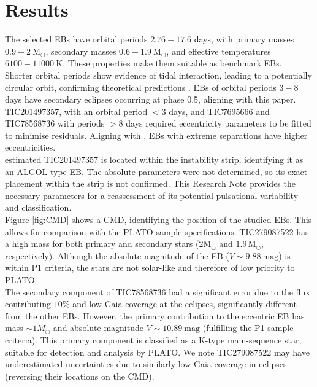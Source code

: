 \section{Results}\label{sec:Results}
The selected EBs have orbital periods $2.76- 17.6$ days, with primary masses $0.9 - 2 \mathrm{\ M_{\odot}}$, secondary masses $0.6 - 1.9\ \mathrm{M_{\odot}}$, and effective temperatures $6100- 11000\ \mathrm{K}$. These properties make them suitable as benchmark EBs.\\ 

Shorter orbital periods show evidence of tidal interaction, leading to a potentially circular orbit, confirming theoretical predictions \citep{Justesen21}. EBs of orbital periods $3-8$ days have secondary eclipses occurring at phase 0.5, aligning with this paper. TIC201497357, with an orbital period $< 3$ days, and TIC7695666 and TIC78568736 with periods $> 8$ days required eccentricity parameters to be fitted to minimise residuals. Aligning with \cite{Justesen21}, EBs with extreme separations have higher eccentricities.\\

\citet{Soydugan06} estimated TIC201497357 is located within the instability strip, identifying it as an ALGOL-type EB. The absolute parameters were not determined, so its exact placement within the strip is not confirmed. This Research Note provides the necessary parameters for a reassessment of its potential pulsational variability and classification.\\

Figure \ref{fig:CMD} shows a CMD, identifying the position of the studied EBs. This allows for comparison with the PLATO sample specifications. TIC279087522 has a high mass for both primary and secondary stars ($2\mathrm{M_{\odot}}$ and $1.9\, \mathrm{M_{\odot}}$, respectively). Although the absolute magnitude of the EB ($V \sim 9.88 \mathrm{\ mag}$) is within P1 criteria, the stars are not solar-like and therefore of low priority to PLATO.\\ 

The secondary component of TIC78568736 had a significant error due to the flux contributing $10\%$ and low Gaia coverage at the eclipses, significantly different from the other EBs. However, the primary contribution to the eccentric EB has mass $\sim 1M_{\odot}$ and absolute magnitude $V \sim 10.89\mathrm{\ mag}$ (fulfilling the P1 sample criteria). This primary component is classified as a K-type main-sequence star, suitable for detection and analysis by PLATO. We note TIC279087522 may have underestimated uncertainties due to similarly low Gaia coverage in eclipses (reversing their locations on the CMD).\\

